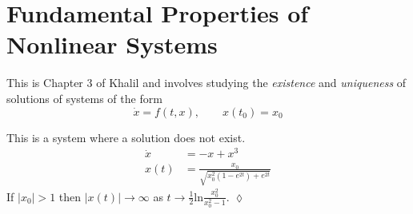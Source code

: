 \section{Fundamental Properties of Nonlinear Systems}
This is Chapter 3 of Khalil and involves studying the \textit{existence} and \textit{uniqueness} of solutions of systems of the form
$$\dot{x} = f (t,x), \qquad x (t_0) = x_0$$

\begin{example}
This is a system where a solution does not exist.
\begin{align*}
\dot{x} &= -x + x^3 \\
x(t) &= \frac{x_0}{\sqrt{x_0^2(1-e^{2t}) + e^{2t}}}
\end{align*}
If $|x_0|>1$ then $|x(t)|\to\infty$ as $t\to\tfrac{1}{2}\text{ln}\frac{x_0^2}{x_0^2-1}$.
$\lozenge$
\end{example}
